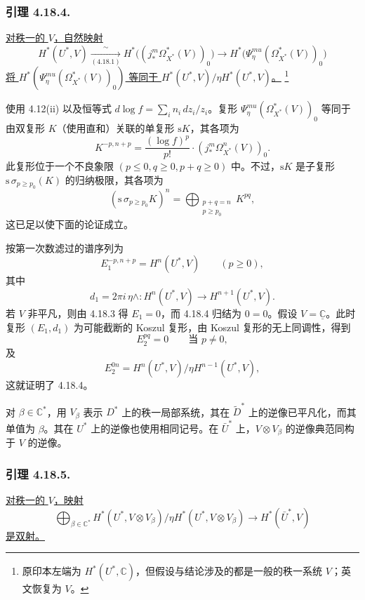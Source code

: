 \subsubsection*{引理 4.18.4.}
\underline{对秩一的 $V$，自然映射}
\[
H^*(U^*,V)
 \xrightarrow[(4.18.1)]{\ \sim\ }
H^*\bigl((j_*^m\Omega_{X^*}^*(V))_0\bigr)
 \longrightarrow
H^*\bigl(\Psi_\eta^{mu}(\Omega_{X^*}^*(V))_0\bigr)
\]
\underline{将 $H^*(\Psi_\eta^{mu}(\Omega_{X^*}^*(V))_0)$ 等同于 $H^*(U^*,V)/\eta H^*(U^*,V)$。}
\footnote{原印本左端为 $H^*(U^*,\mathbb C)$，但假设与结论涉及的都是一般的秩一系统 $V$；英文恢复为 $V$。}

使用 4.12(ii) 以及恒等式 $d\log f=\sum_i n_i\,dz_i/z_i$。复形 $\Psi_\eta^{mu}(\Omega_{X^*}^*(V))_0$ 等同于由双复形 $K$（使用直和）关联的单复形 $\mathrm{s}K$，其各项为
\[
K^{-p,n+p}=\frac{(\log f)^p}{p!}\cdot
  (j_*^m\Omega_{X^*}^n(V))_0.
\]
此复形位于一个不良象限 $(p\leq0,q\geq0,p+q\geq0)$ 中。不过，$\mathrm{s}K$ 是子复形 $\mathrm{s}\,\sigma_{p\geq p_0}(K)$ 的归纳极限，其各项为
\[
(\mathrm{s}\,\sigma_{p\geq p_0}K)^n
=\bigoplus_{\substack{p+q=n\\p\geq p_0}}K^{pq},
\]
这已足以使下面的论证成立。

按第一次数滤过的谱序列为
\[
E_1^{-p,n+p}=H^n(U^*,V)\qquad(p\geq0),
\]
其中
\[
d_1=2\pi i\,\eta\wedge:
H^n(U^*,V)\longrightarrow H^{n+1}(U^*,V).
\]
若 $V$ 非平凡，则由 4.18.3 得 $E_1=0$，而 4.18.4 归结为 $0=0$。假设 $V=\underline{\mathbb C}$。此时复形 $(E_1,d_1)$ 为可能截断的 Koszul 复形，由 Koszul 复形的无上同调性，得到
\[
E_2^{pq}=0\qquad\text{当 }p\ne0,
\]
及
\[
E_2^{0n}=H^n(U^*,V)/\eta H^{n-1}(U^*,V),
\]
这就证明了 4.18.4。

对 $\beta\in\mathbb C^*$，用 $V_\beta$ 表示 $D^*$ 上的秩一局部系统，其在 $\widetilde D^*$ 上的逆像已平凡化，而其单值为 $\beta$。其在 $U^*$ 上的逆像也使用相同记号。在 $\bar U^*$ 上，$V\otimes V_\beta$ 的逆像典范同构于 $V$ 的逆像。

\subsubsection*{引理 4.18.5.}
\underline{对秩一的 $V$，映射}
\[
\bigoplus_{\beta\in\mathbb C^*}
H^*(U^*,V\otimes V_\beta)/
 \eta H^*(U^*,V\otimes V_\beta)
\longrightarrow H^*(\bar U^*,V)
\]
\underline{是双射。}


